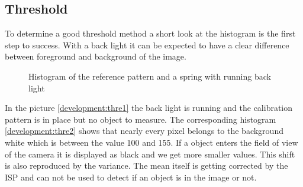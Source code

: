 \subsection{Threshold}
To determine a good threshold method a short look at the histogram is the first step to success. With a back light it can be expected to have a clear difference between foreground and background of the image. 
\begin{figure}[H]
	\caption{Histogram of the reference pattern and a spring with running back light\label{development:thre}}	
\end{figure}
\newpage
In the picture \ref{development:thre1} the back light is running and the calibration pattern is in place but no object to measure. The corresponding histogram \ref{development:thre2} shows that nearly every pixel belongs to the background white which is between the value 100 and 155. If a object enters the field of view of the camera it is displayed as black and we get more smaller values. This shift is also reproduced by the variance. The mean itself is getting corrected by the ISP and can not be used to detect if an object is in the image or not.\\
